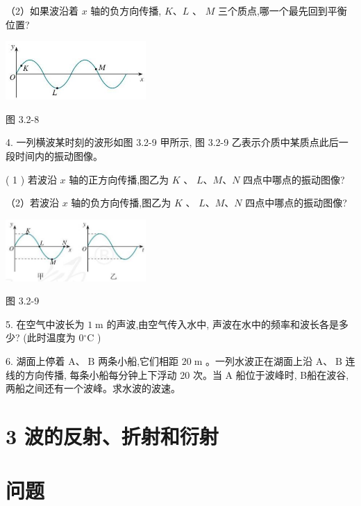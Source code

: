 \documentclass[10pt]{article}
\begin{document}
（2）如果波沿着 \(x\) 轴的负方向传播, \(K\text{、}L\) 、 \(M\) 三个质点,哪一个最先回到平衡位置?

\begin{center}
\includegraphics[max width=0.4\textwidth]{images/01910e4c-ebb8-7d2c-8f2f-2375bc1d2d12_75_555361.jpg}
\end{center}

图 3.2-8

4. 一列横波某时刻的波形如图 3.2-9 甲所示, 图 3.2-9 乙表示介质中某质点此后一段时间内的振动图像。

( 1 ) 若波沿 \(x\) 轴的正方向传播,图乙为 \(K\) 、 \(L\text{、}M\text{、}N\) 四点中哪点的振动图像?

（2）若波沿 \(x\) 轴的负方向传播,图乙为 \(K\) 、 \(L\text{、}M\text{、}N\) 四点中哪点的振动图像?

\begin{center}
\includegraphics[max width=0.4\textwidth]{images/01910e4c-ebb8-7d2c-8f2f-2375bc1d2d12_75_962372.jpg}
\end{center}

图 3.2-9

5. 在空气中波长为 \(1\mathrm{\;m}\) 的声波,由空气传入水中, 声波在水中的频率和波长各是多少? (此时温度为 \(0{}^{ \circ }\mathrm{C}\) )

6. 湖面上停着 \(\mathrm{A}\text{、}\mathrm{\;B}\) 两条小船,它们相距 \({20}\mathrm{\;m}\) 。一列水波正在湖面上沿 \(\mathrm{A}\text{、}\mathrm{\;B}\) 连线的方向传播, 每条小船每分钟上下浮动 20 次。当 A 船位于波峰时, B船在波谷, 两船之间还有一个波峰。求水波的波速。

\section*{3 波的反射、折射和衍射}

\section*{问题}
\end{document}

